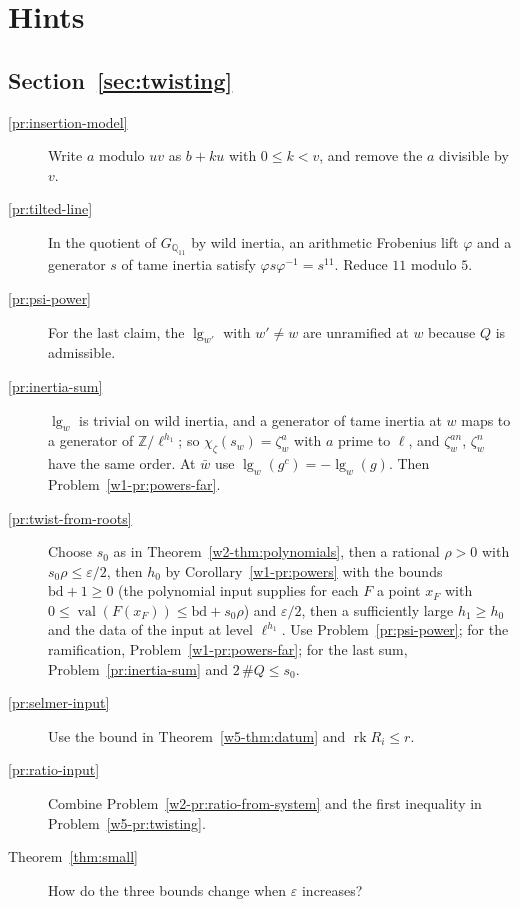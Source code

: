 \documentclass[reqno]{amsart}
\theoremstyle{definition}
\theoremstyle{plain}
\newcommand{\Z}{\mathbb{Z}}
\newcommand{\Q}{\mathbb{Q}}
\newcommand{\val}{\operatorname{val}}
\newcommand{\bd}{\mathrm{bd}}
\begin{document}
\section*{Hints}

\subsection*{Section~\ref{sec:twisting}}
\begin{description}
\item[\ref{pr:insertion-model}] Write \(a\) modulo \(uv\) as \(b + ku\) with \(0 \le k < v\), and remove the \(a\) divisible by \(v\).
\item[\ref{pr:tilted-line}] In the quotient of \(G_{\Q_{11}}\) by wild inertia, an arithmetic Frobenius lift \(\varphi\) and a generator \(s\) of tame inertia satisfy \(\varphi s\varphi^{-1} = s^{11}\).  Reduce \(11\) modulo \(5\).
\item[\ref{pr:psi-power}] For the last claim, the \(\lg_{w'}\) with \(w' \ne w\) are unramified at \(w\) because \(Q\) is admissible.
\item[\ref{pr:inertia-sum}] \(\lg_w\) is trivial on wild inertia, and a generator of tame inertia at \(w\) maps to a generator of \(\Z/\ell^{h_1}\); so \(\chi_\zeta(s_w) = \zeta_w^a\) with \(a\) prime to \(\ell\), and \(\zeta_w^{an}\), \(\zeta_w^n\) have the same order.  At \(\bar w\) use \(\lg_w(g^c) = -\lg_w(g)\).  Then Problem~\ref{w1-pr:powers-far}.
\item[\ref{pr:twist-from-roots}] Choose \(s_0\) as in Theorem~\ref{w2-thm:polynomials}, then a rational \(\rho > 0\) with \(s_0\rho \le \varepsilon/2\), then \(h_0\) by Corollary~\ref{w1-pr:powers} with the bounds \(\bd + 1 \ge 0\) (the polynomial input supplies for each \(F\) a point \(x_F\) with \(0\le\val(F(x_F))\le\bd+s_0\rho\)) and \(\varepsilon/2\), then a sufficiently large \(h_1 \ge h_0\) and the data of the input at level \(\ell^{h_1}\).  Use Problem~\ref{pr:psi-power}; for the ramification, Problem~\ref{w1-pr:powers-far}; for the last sum, Problem~\ref{pr:inertia-sum} and \(2\,\#Q \le s_0\).
\item[\ref{pr:selmer-input}] Use the bound in Theorem~\ref{w5-thm:datum} and \(\operatorname{rk} R_i \le r\).
\item[\ref{pr:ratio-input}] Combine Problem~\ref{w2-pr:ratio-from-system} and the first inequality in Problem~\ref{w5-pr:twisting}.
\item[Theorem~\ref{thm:small}] How do the three bounds change when \(\varepsilon\) increases?
\end{description}
\end{document}
